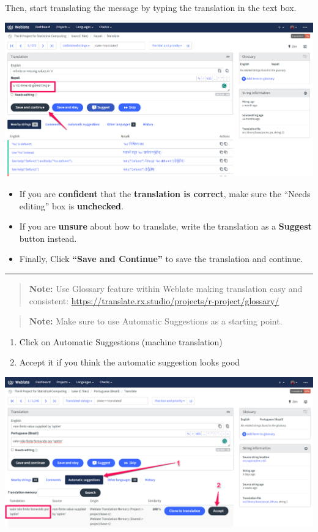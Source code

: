\documentclass[
]{book}
\begin{document}
Then, start translating the message by typing the translation in the
text box.

\includegraphics{img/translate_string_and_save.png}

\begin{itemize}
\item
  If you are \textbf{confident} that the \textbf{translation is correct}, make
  sure the ``Needs editing'' box is \textbf{unchecked}.
\item
  If you are \textbf{unsure} about how to translate, write the translation
  as a \textbf{Suggest} button instead.
\item
  Finally, Click \textbf{``Save and Continue''} to save the translation and
  continue.
\end{itemize}

\begin{center}\rule{0.5\linewidth}{0.5pt}\end{center}

\begin{quote}
\textbf{Note:} Use Glossary feature within Weblate making translation easy
and consistent:
\url{https://translate.rx.studio/projects/r-project/glossary/}
\end{quote}

\begin{quote}
\textbf{Note:} Make sure to use Automatic Suggestions as a starting point.
\end{quote}

\begin{enumerate}
\def\labelenumi{\arabic{enumi}.}
\item
  Click on Automatic Suggestions (machine translation)
\item
  Accept it if you think the automatic suggestion looks good
\end{enumerate}

\includegraphics{img/auto-suggestion.png}
\end{document}
